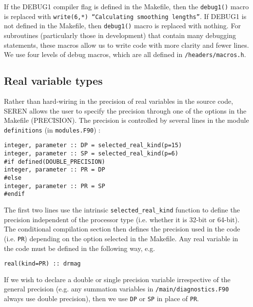 \documentclass[a4paper]{article}
\newcommand{\var}[1]{\texttt{#1}}
\begin{document}
If the DEBUG1 compiler flag is defined in the Makefile, then the 
\var{debug1()} macro is replaced with 
\var{write(6,*) ``Calculating smoothing lengths''}.  
If DEBUG1 is not defined in the Makefile, then \var{debug1()} macro is replaced with nothing. For subroutines (particularly those in development) that contain many debugging statements, these macros allow us to write code with more clarity and fewer lines. We use four levels of debug macros, which are all defined in \var{/headers/macros.h}. 



\subsection{Real variable types} \label{SS:VARTYPES}
Rather than hard-wiring in the precision of real variables in the source code, SEREN allows the user to specify the precision through one of the options in the Makefile (PRECISION).  The precision is controlled by several lines in the module \var{definitions} (in \var{modules.F90}) : \newline

\indent \var{integer, parameter :: DP = selected\_real\_kind(p=15)} \\
\indent \var{integer, parameter :: SP = selected\_real\_kind(p=6)}  \\ 

\noindent \var{\#if defined(DOUBLE\_PRECISION)} \\
\indent \var{integer, parameter :: PR = DP} \\
\noindent \var{\#else}\\
\indent \var{integer, parameter :: PR = SP} \\
\noindent \var{\#endif}\newline


\noindent The first two lines use the intrinsic \var{selected\_real\_kind} function to define the precision independent of the processor type (i.e. whether it is 32-bit or 64-bit).  The conditional compilation section then defines the precision used in the code (i.e. \var{PR}) depending on the option selected in the Makefile.  Any real variable in the code must be defined in the following way, e.g. \newline

\indent \var{real(kind=PR) :: drmag} \newline

\noindent If we wish to declare a double or single precision variable irrespective of the general precision (e.g. any summation variables in \var{/main/diagnostics.F90} always use double precision), then we use \var{DP} or \var{SP} in place of \var{PR}. 
\end{document}
